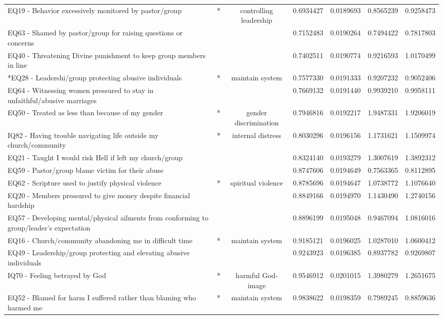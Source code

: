 \documentclass[
]{article}
\begin{document}
\begin{longtable}[t]{>{\raggedright\arraybackslash}p{11cm}cccccc}
*EQ19 - Behavior excessively monitored by pastor/group & * & controlling leadership & 0.6934427 & 0.0189693 & 0.8565239 & 0.9258473\\
EQ63 - Shamed by pastor/group for raising questions or concerns &  &  & 0.7152483 & 0.0190264 & 0.7494422 & 0.7817803\\
EQ40 - Threatening Divine punishment to keep group members in line &  &  & 0.7402511 & 0.0190774 & 0.9216593 & 1.0170499\\
\addlinespace
*EQ28 - Leadershi/group protecting abusive individuals & * & maintain system & 0.7577330 & 0.0191333 & 0.9207232 & 0.9052406\\
EQ64 - Witnessing women pressured to stay in unfaithful/abusive marriages &  &  & 0.7669132 & 0.0191440 & 0.9939210 & 0.9958111\\
EQ50 - Treated as less than because of my gender & * & gender discrimination & 0.7946816 & 0.0192217 & 1.9487331 & 1.9206019\\
*IQ82 - Having trouble navigating life outside my church/community & * & internal distress & 0.8030296 & 0.0196156 & 1.1731621 & 1.1509974\\
EQ21 - Taught I would risk Hell if left my church/group &  &  & 0.8324140 & 0.0193279 & 1.3007619 & 1.3892312\\
\addlinespace
EQ59 - Pastor/group blame victim for their abuse &  &  & 0.8747606 & 0.0194649 & 0.7563365 & 0.8112895\\
*EQ62 - Scripture used to justify physical violence & * & spiritual violence & 0.8785696 & 0.0194647 & 1.0738772 & 1.1076640\\
EQ20 - Members pressured to give money despite financial hardship &  &  & 0.8849166 & 0.0194970 & 1.1430490 & 1.2740156\\
EQ57 - Developing mental/physical ailments from conforming to group/leader’s expectation &  &  & 0.8896199 & 0.0195048 & 0.9467094 & 1.0816016\\
*EQ16 - Church/community abandoning me in difficult time & * & maintain system & 0.9185121 & 0.0196025 & 1.0287010 & 1.0600412\\
\addlinespace
EQ49 - Leadership/group protecting and elevating abusive individuals &  &  & 0.9243923 & 0.0196385 & 0.8937782 & 0.9269807\\
*IQ70 - Feeling betrayed by God & * & harmful God-image & 0.9546912 & 0.0201015 & 1.3980279 & 1.2651675\\
*EQ52 - Blamed for harm I suffered rather than blaming who harmed me & * & maintain system & 0.9838622 & 0.0198359 & 0.7989245 & 0.8859636\\

\end{longtable}
\end{document}
